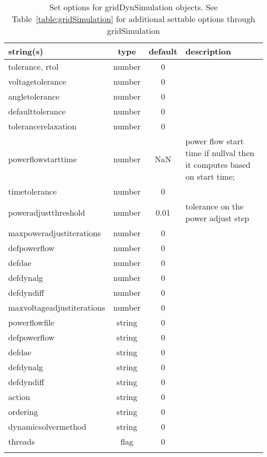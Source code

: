 \begin{longtable}{p{5cm} c c p{7cm}}
string(s) & type & default & description \\
\hline
tolerance, rtol & number & 0 & \\
voltagetolerance & number & 0 & \\
angletolerance & number & 0 & \\
defaulttolerance & number & 0 & \\
tolerancerelaxation & number & 0 & \\
powerflowstarttime & number & NaN & power flow start time  if nullval then it computes based on start time;\\
timetolerance & number & 0 & \\
poweradjustthreshold & number & 0.01 & tolerance on the power adjust step\\
maxpoweradjustiterations & number & 0 & \\
defpowerflow & number & 0 & \\
defdae & number & 0 & \\
defdynalg & number & 0 & \\
defdyndiff & number & 0 & \\
maxvoltageadjustiterations & number & 0 & \\
powerflowfile & string & 0 & \\
defpowerflow & string & 0 & \\
defdae & string & 0 & \\
defdynalg & string & 0 & \\
defdyndiff & string & 0 & \\
action & string & 0 & \\
ordering & string & 0 & \\
dynamicsolvermethod & string & 0 & \\
threads & flag & 0 & \\
\hline
\caption{Set options for gridDynSimulation objects. See Table~\ref{table:gridSimulation} for additional settable options through gridSimulation}
\label{table:gridDynSimulation}
\end{longtable}
